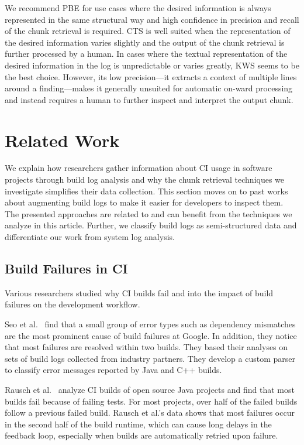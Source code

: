 We recommend PBE for use cases where the desired information is always
represented in the same structural way and high confidence in precision
and
recall of the chunk retrieval is required.
CTS is well suited when the representation of the desired information
varies
slightly and the output of the chunk retrieval is further processed by
a human.
In cases where the textual representation of the desired information in
the log
is unpredictable or varies greatly, KWS seems to be the best choice.
However,
its low precision---it extracts a context of multiple lines around a
finding---makes it generally unsuited for automatic on-ward processing and
instead requires a human to further inspect and interpret the output
chunk.

\section{Related Work}
\label{sec:rw}
We explain how researchers gather information about CI usage in software
projects
through build log analysis and why the chunk retrieval techniques we
investigate
simplifies their data collection.
This section moves on to past works about augmenting build logs to make
it easier
for developers to inspect them.
The presented approaches are related to and can benefit from the
techniques we
analyze in this article.
Further, we classify build logs as semi-structured data and differentiate
our
work from system log analysis.

\subsection{Build Failures in CI}
Various researchers studied why CI builds fail and into the impact of
build failures on the development workflow.

Seo et al.~\cite{seo2014programmers} find that a small group of error
types such as dependency mismatches are the most prominent cause of
build failures at Google.
In addition, they notice that most failures
are resolved within two builds.
They based their analyses on sets of
build logs collected from industry partners.
They develop a custom
parser to classify error messages reported by Java and C++ builds.

Rausch et al.~\cite{rausch2017empirical} analyze CI builds of open
source Java projects and find that most builds fail because of failing
tests.
For most projects, over half of the failed builds follow a
previous failed build.
Rausch et al.'s data shows that most failures
occur in the second half of the build runtime, which can cause long
delays in the feedback loop, especially when builds are automatically
retried upon failure.

